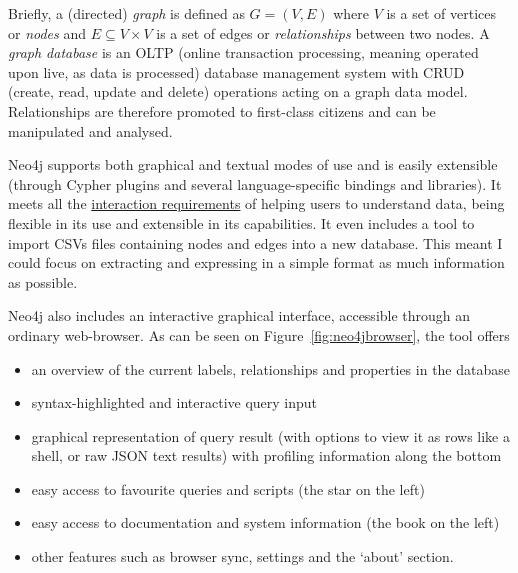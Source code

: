 Briefly, a (directed) \emph{graph} is defined as $G = (V, E)$ where $V$ is a set
of vertices or \emph{nodes} and $E \subseteq V \times V$ is a set of edges or
\emph{relationships} between two nodes. A \emph{graph database} is an OLTP
(online transaction processing, meaning operated upon live, as data is
processed) database management system with CRUD (create, read, update and delete)
operations acting on a graph data model. Relationships are therefore promoted to
first-class citizens and can be manipulated and analysed.

Neo4j supports both graphical and textual modes of use and is easily extensible
(through Cypher plugins and several language-specific bindings and libraries).
It meets all the \hyperref[req:i1]{interaction requirements} of helping users to
understand data, being flexible in its use and extensible in its capabilities.
It even includes a tool to import CSVs files containing nodes and edges into a
new database. This meant I could focus on extracting and expressing in a simple
format as much information as possible.

Neo4j also includes an interactive graphical interface, accessible through an
ordinary web-browser. As can be seen on Figure~\ref{fig:neo4jbrowser}, the tool
offers
\begin{itemize}
  \item an overview of the current labels, relationships and properties in the
        database
  \item syntax-highlighted and interactive query input
  \item graphical representation of query result (with options to view it as
        rows like a shell, or raw JSON text results) with profiling information
        along the bottom
  \item easy access to favourite queries and scripts (the star on the left)
  \item easy access to documentation and system information (the book on the
        left)
  \item other features such as browser sync, settings and the `about' section.
\end{itemize}

